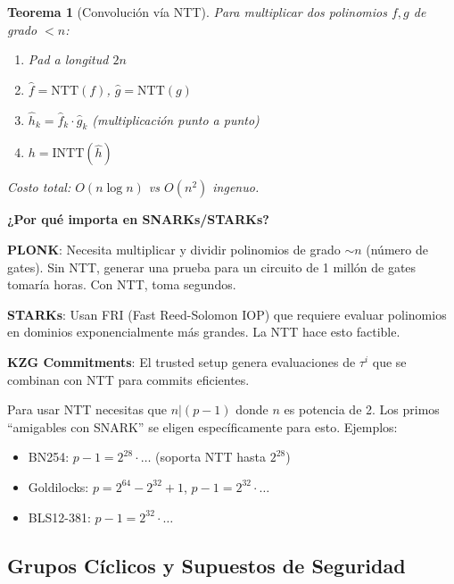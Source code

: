 \documentclass[11pt,a4paper,twoside,openright]{book}
\theoremstyle{definition}
\theoremstyle{plain}
\newtheorem{theorem}{Teorema}[chapter]
\theoremstyle{remark}
\begin{document}
\begin{theorem}[Convolución vía NTT]
Para multiplicar dos polinomios $f, g$ de grado $< n$:
\begin{enumerate}
    \item Pad a longitud $2n$
    \item $\hat{f} = \text{NTT}(f)$, $\hat{g} = \text{NTT}(g)$
    \item $\hat{h}_k = \hat{f}_k \cdot \hat{g}_k$ (multiplicación punto a punto)
    \item $h = \text{INTT}(\hat{h})$
\end{enumerate}
Costo total: $O(n \log n)$ vs $O(n^2)$ ingenuo.
\end{theorem}

\begin{bancozk}
\textbf{¿Por qué importa en SNARKs/STARKs?}

\textbf{PLONK}: Necesita multiplicar y dividir polinomios de grado $\sim n$ (número de gates). Sin NTT, generar una prueba para un circuito de 1 millón de gates tomaría horas. Con NTT, toma segundos.

\textbf{STARKs}: Usan FRI (Fast Reed-Solomon IOP) que requiere evaluar polinomios en dominios exponencialmente más grandes. La NTT hace esto factible.

\textbf{KZG Commitments}: El trusted setup genera evaluaciones de $\tau^i$ que se combinan con NTT para commits eficientes.
\end{bancozk}

\begin{advertencia}
Para usar NTT necesitas que $n | (p-1)$ donde $n$ es potencia de 2. Los primos ``amigables con SNARK'' se eligen específicamente para esto. Ejemplos:
\begin{itemize}
    \item BN254: $p - 1 = 2^{28} \cdot \ldots$ (soporta NTT hasta $2^{28}$)
    \item Goldilocks: $p = 2^{64} - 2^{32} + 1$, $p - 1 = 2^{32} \cdot \ldots$
    \item BLS12-381: $p - 1 = 2^{32} \cdot \ldots$
\end{itemize}
\end{advertencia}

\subsection{Grupos Cíclicos y Supuestos de Seguridad}
\end{document}

